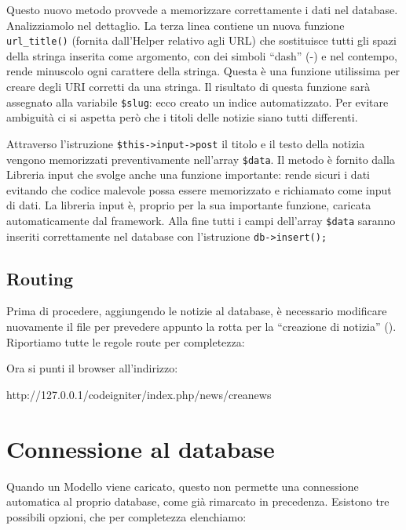 Questo nuovo metodo provvede a memorizzare correttamente i dati nel database. Analizziamolo nel dettaglio. La terza linea contiene un nuova funzione \verb|url_title()| (fornita dall'Helper relativo agli URL) che sostituisce tutti gli spazi della stringa inserita come argomento, con dei simboli ``dash'' (-) e nel contempo, rende minuscolo ogni carattere della stringa. Questa è una funzione utilissima per creare degli \ac{URI} corretti da una stringa. Il risultato di questa funzione sarà assegnato alla variabile \verb|$slug|: ecco creato un indice automatizzato. Per evitare ambiguità ci si aspetta però che i titoli delle notizie siano tutti differenti.

Attraverso l'istruzione \verb|$this->input->post| il titolo e il testo della notizia vengono memorizzati preventivamente nell'array \verb|$data|. Il metodo  è fornito dalla Libreria input che svolge anche una funzione importante: rende sicuri i dati evitando che codice malevole possa essere memorizzato e richiamato come input di dati. La libreria input è, proprio per la sua importante funzione, caricata automaticamente dal framework. Alla fine tutti i campi dell'array \verb|$data| saranno inseriti correttamente nel database con l'istruzione \verb|db->insert();|

\subsection{Routing}
Prima di procedere, aggiungendo le notizie al database, è necessario modificare nuovamente il file  per prevedere appunto la rotta per la ``creazione di notizia'' (). Riportiamo tutte le regole route per completezza:


Ora si punti il browser all'indirizzo:

\begin{code}
http://127.0.0.1/codeigniter/index.php/news/creanews
\end{code}

\label{sec:accessodb}
\section{Connessione al database}
Quando un Modello viene caricato, questo non permette una connessione automatica al proprio database, come già rimarcato in precedenza. Esistono tre possibili opzioni, che per completezza elenchiamo:

